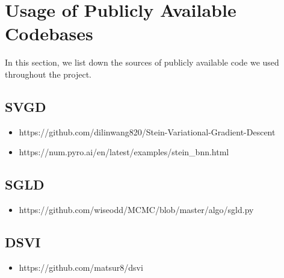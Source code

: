 \section{Usage of Publicly Available Codebases}
In this section, we list down the sources of publicly available code we used throughout the project.
\subsection{SVGD}
\begin{itemize}
    \item https://github.com/dilinwang820/Stein-Variational-Gradient-Descent
    \item https://num.pyro.ai/en/latest/examples/stein\_bnn.html
\end{itemize}

\subsection{SGLD}
\begin{itemize}
    \item https://github.com/wiseodd/MCMC/blob/master/algo/sgld.py
\end{itemize}

\subsection{DSVI}
\begin{itemize}
    \item https://github.com/matsur8/dsvi
\end{itemize}